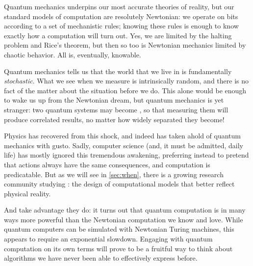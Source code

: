 Quantum mechanics underpins our most accurate theories of
reality,\footnotemark{} but our standard models of computation are resolutely
Newtonian: we operate on bits according to a set of mechanistic rules; knowing
these rules is enough to know exactly how a computation will turn out.  Yes, we
are limited by the halting problem and Rice's theorem, but then so too is
Newtonian mechanics limited by chaotic behavior.  All is, eventually, knowable.


Quantum mechanics tells us that the world that we live in is fundamentally
\emph{stochastic}.  What we see when we measure is intrinsically random, and
there is no fact of the matter about the situation before we do.\footnotemark{}
This alone would be enough to wake us up from the Newtonian dream, but quantum
mechanics is yet stranger: two quantum systems may become , so
that measuring them will produce correlated results, no matter how widely
separated they become!


Physics has recovered from this shock, and indeed has taken ahold of quantum
mechanics with gusto.  Sadly, computer science (and, it must be admitted, daily
life) has mostly ignored this tremendous awakening, preferring instead to
pretend that actions always have the same consequences, and
computation is predicatable.  
But as we will see in \cref{sec:when}, there is a growing research community studying
: the design of computational models that better reflect
physical reality.

And take advantage they do: it turns out that quantum computation is in many ways more
powerful than the Newtonian computation we know and love.  While quantum
computers can be simulated with Newtonian Turing machines, this appears to
require an exponential slowdown.  \citeme{}  Engaging with quantum computation
on its own terms will prove to be a fruitful way to think about
algorithms we have never been able to effectively express before.

